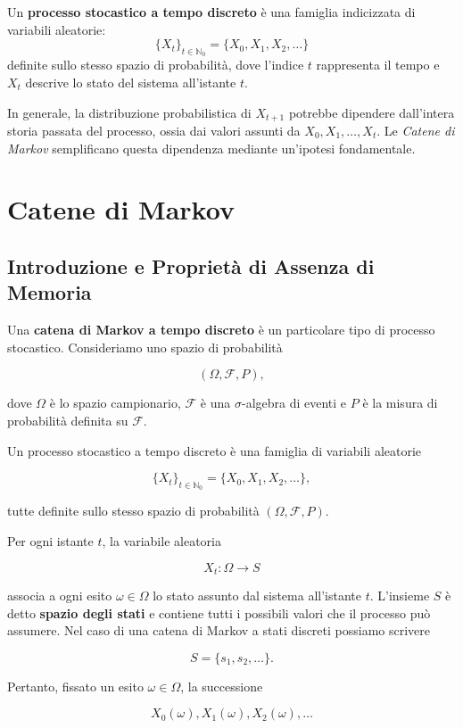 Un \textbf{processo stocastico a tempo discreto} è una famiglia indicizzata di variabili aleatorie:
\[
\{X_t\}_{t \in \mathbb{N}_0} = \{X_0, X_1, X_2, \dots\}
\]
definite sullo stesso spazio di probabilità, dove l'indice $t$ rappresenta il tempo e $X_t$ descrive lo stato del sistema all'istante $t$. 

In generale, la distribuzione probabilistica di $X_{t+1}$ potrebbe dipendere dall'intera storia passata del processo, ossia dai valori assunti da $X_0, X_1, \dots, X_t$. Le \emph{Catene di Markov} semplificano questa dipendenza mediante un'ipotesi fondamentale.

\newpage

\section{Catene di Markov}

\subsection{Introduzione e Proprietà di Assenza di Memoria}

Una \textbf{catena di Markov a tempo discreto} è un particolare tipo di processo stocastico. Consideriamo uno spazio di probabilità

$$
(\Omega,\mathcal{F},P),
$$

dove $\Omega$ è lo spazio campionario, $\mathcal{F}$ è una $\sigma$-algebra di eventi e $P$ è la misura di probabilità definita su $\mathcal{F}$.

Un processo stocastico a tempo discreto è una famiglia di variabili aleatorie

$$
\{X_t\}_{t\in\mathbb{N}_0}
=
\{X_0,X_1,X_2,\ldots\},
$$

tutte definite sullo stesso spazio di probabilità $(\Omega,\mathcal{F},P)$.

Per ogni istante $t$, la variabile aleatoria

$$
X_t:\Omega\longrightarrow S
$$

associa a ogni esito $\omega\in\Omega$ lo stato assunto dal sistema all'istante $t$. L'insieme $S$ è detto \textbf{spazio degli stati} e contiene tutti i possibili valori che il processo può assumere. Nel caso di una catena di Markov a stati discreti possiamo scrivere

$$
S=\{s_1,s_2,\ldots\}.
$$

Pertanto, fissato un esito $\omega\in\Omega$, la successione

$$
X_0(\omega),X_1(\omega),X_2(\omega),\ldots
$$

